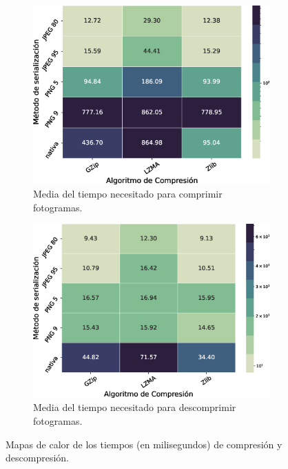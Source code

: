 \begin{figure}
	\centering
	
	\begin{subfigure}[b]{0.9\textwidth}
		\includegraphics[width=\textwidth]{img/TiempoMedioCompLog.eps}
		\caption{Media del tiempo necesitado para comprimir fotogramas.}
		\label{fig:heatmaptini}
	\end{subfigure}
	\begin{subfigure}[b]{0.9\textwidth}
		\includegraphics[width=\textwidth]{img/TiempoMedioDesLog.eps}
		\caption{Media del tiempo necesitado para descomprimir fotogramas.}
		\label{fig:heatmaptfin}
	\end{subfigure}
	\caption{Mapas de calor de los tiempos (en milisegundos) de compresión y descompresión.}
	\label{fig:resultsComp}
\end{figure}

